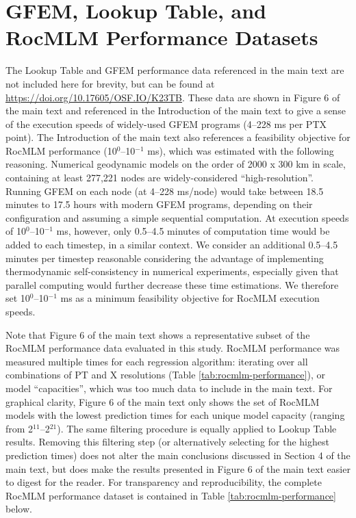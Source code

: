 \documentclass[draft]{agujournal2018}
\begin{document}
\clearpage

\section*{GFEM, Lookup Table, and RocMLM Performance Datasets}\label{gfem-lookup-table-and-rocmlm-performance-datasets}

The Lookup Table and GFEM performance data referenced in the main text are not included here for brevity, but can be found at \url{https://doi.org/10.17605/OSF.IO/K23TB}. These data are shown in Figure 6 of the main text and referenced in the Introduction of the main text to give a sense of the execution speeds of widely-used GFEM programs (4--228 ms per PTX point). The Introduction of the main text also references a feasibility objective for RocMLM performance (10\(^0\)--10\(^{−1}\) ms), which was estimated with the following reasoning. Numerical geodynamic models on the order of 2000 x 300 km in scale, containing at least 277,221 nodes \citep[921 x 301, e.g.,][]{kerswell2021} are widely-considered ``high-resolution''. Running GFEM on each node (at 4--228 ms/node) would take between 18.5 minutes to 17.5 hours with modern GFEM programs, depending on their configuration and assuming a simple sequential computation. At execution speeds of 10\(^0\)--10\(^{−1}\) ms, however, only 0.5--4.5 minutes of computation time would be added to each timestep, in a similar context. We consider an additional 0.5--4.5 minutes per timestep reasonable considering the advantage of implementing thermodynamic self-consistency in numerical experiments, especially given that parallel computing would further decrease these time estimations. We therefore set 10\(^0\)--10\(^{−1}\) ms as a minimum feasibility objective for RocMLM execution speeds.

Note that Figure 6 of the main text shows a representative subset of the RocMLM performance data evaluated in this study. RocMLM performance was measured multiple times for each regression algorithm: iterating over all combinations of PT and X resolutions (Table \ref{tab:rocmlm-performance}), or model ``capacities'', which was too much data to include in the main text. For graphical clarity, Figure 6 of the main text only shows the set of RocMLM models with the lowest prediction times for each unique model capacity (ranging from 2\(^{11}\)--2\(^{21}\)). The same filtering procedure is equally applied to Lookup Table results. Removing this filtering step (or alternatively selecting for the highest prediction times) does not alter the main conclusions discussed in Section 4 of the main text, but does make the results presented in Figure 6 of the main text easier to digest for the reader. For transparency and reproducibility, the complete RocMLM performance dataset is contained in Table \ref{tab:rocmlm-performance} below.
\end{document}
